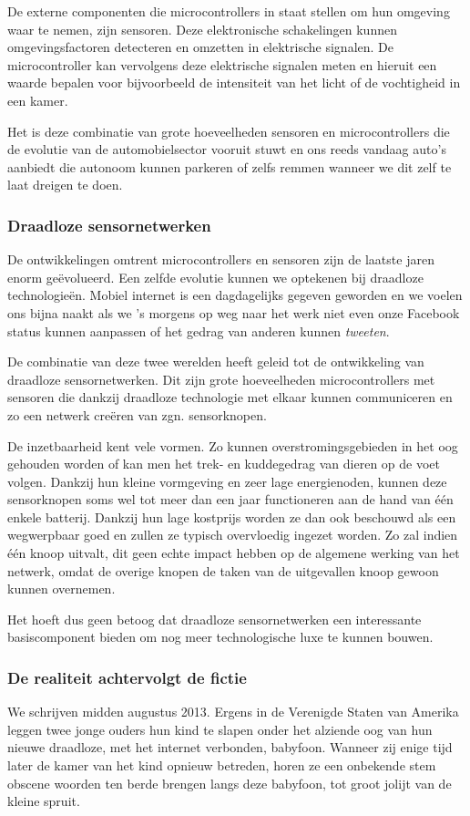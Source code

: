 \documentclass[DIV=calc,paper=a4,fontsize=11pt,twocolumn,draft]{scrartcl}
\newcommand{\heading}[1]{
\subsubsection*{#1}
\vspace{-2mm}
}
\begin{document}
De externe componenten die microcontrollers in staat stellen om hun omgeving
waar te nemen, zijn sensoren. Deze elektronische schakelingen kunnen
omgevingsfactoren detecteren en omzetten in elektrische signalen. De
microcontroller kan vervolgens deze elektrische signalen meten en hieruit een
waarde bepalen voor bijvoorbeeld de intensiteit van het licht of de vochtigheid
in een kamer.

Het is deze combinatie van grote hoeveelheden sensoren en microcontrollers die
de evolutie van de automobielsector vooruit stuwt en ons reeds vandaag auto's
aanbiedt die autonoom kunnen parkeren of zelfs remmen wanneer we dit zelf te
laat dreigen te doen.

\heading{Draadloze sensornetwerken}

De ontwikkelingen omtrent microcontrollers en sensoren zijn de laatste jaren
enorm ge\"evolueerd. Een zelfde evolutie kunnen we optekenen bij draadloze
technologie\"en. Mobiel internet is een dagdagelijks gegeven geworden en we
voelen ons bijna naakt als we 's morgens op weg naar het werk niet even onze
Facebook status kunnen aanpassen of het gedrag van anderen kunnen
\emph{tweeten}.

De combinatie van deze twee werelden heeft geleid tot de ontwikkeling van
draadloze sensornetwerken. Dit zijn grote hoeveelheden microcontrollers met
sensoren die dankzij draadloze technologie met elkaar kunnen communiceren en zo
een netwerk cre\"eren van zgn. sensorknopen.

De inzetbaarheid kent vele vormen. Zo kunnen overstromingsgebieden in het oog
gehouden worden of kan men het trek- en kuddegedrag van dieren op de voet
volgen. Dankzij hun kleine vormgeving en zeer lage energienoden, kunnen deze
sensorknopen soms wel tot meer dan een jaar functioneren aan de hand van
\'e\'en enkele batterij. Dankzij hun lage kostprijs worden ze dan ook beschouwd
als een wegwerpbaar goed en zullen ze typisch overvloedig ingezet worden. Zo
zal indien \'e\'en knoop uitvalt, dit geen echte impact hebben op de algemene
werking van het netwerk, omdat de overige knopen de taken van de uitgevallen
knoop gewoon kunnen overnemen.

Het hoeft dus geen betoog dat draadloze sensornetwerken een interessante
basiscomponent bieden om nog meer technologische luxe te kunnen bouwen.

\heading{De realiteit achtervolgt de fictie}

We schrijven midden augustus 2013. Ergens in de Verenigde Staten van Amerika
leggen twee jonge ouders hun kind te slapen onder het alziende oog van hun
nieuwe draadloze, met het internet verbonden, babyfoon. Wanneer zij enige tijd
later de kamer van het kind opnieuw betreden, horen ze een onbekende stem
obscene woorden ten berde brengen langs deze babyfoon, tot groot jolijt van de
kleine spruit.
\end{document}
